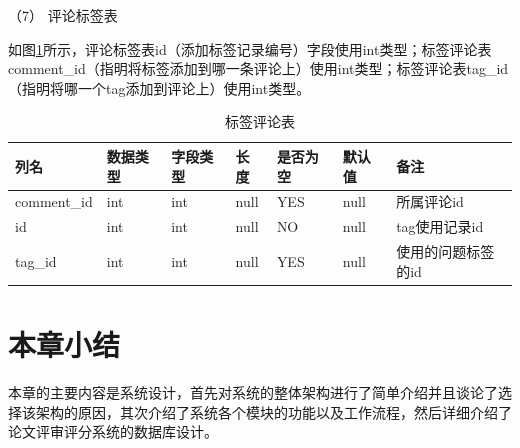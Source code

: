 （7）  评论标签表

如图\ref{db-tag-comment}所示，评论标签表id（添加标签记录编号）字段使用int类型；标签评论表comment\_id（指明将标签添加到哪一条评论上）使用int类型；标签评论表tag\_id（指明将哪一个tag添加到评论上）使用int类型。
\begin{table}[]
    \centering
    \song\wuhao
    \caption{标签评论表}
    \label{db-tag-comment}
    \begin{tabular}{lllllll}
        \hline
        列名        & 数据类型 & 字段类型 & 长度 & 是否为空 & 默认值 & 备注               \\ \hline
        comment\_id & int      & int      & null & YES      & null   & 所属评论id         \\
        id          & int      & int      & null & NO       & null   & tag使用记录id      \\
        tag\_id     & int      & int      & null & YES      & null   & 使用的问题标签的id \\ \hline
    \end{tabular}
\end{table}

\section{本章小结}

本章的主要内容是系统设计，首先对系统的整体架构进行了简单介绍并且谈论了选择该架构的原因，其次介绍了系统各个模块的功能以及工作流程，然后详细介绍了论文评审评分系统的数据库设计。
